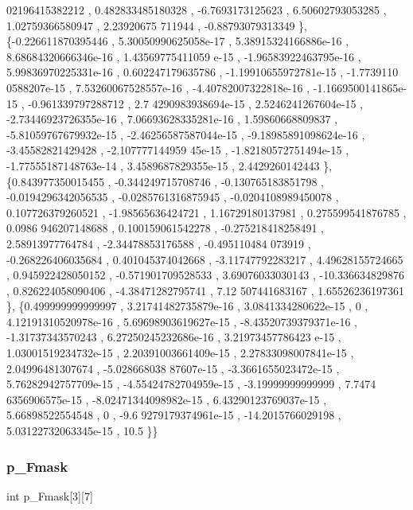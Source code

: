 \begin{DoxyCode}
      02196415382212 , 0.482833485180328 ,  -6.7693173125623 ,  6.50602793053285 ,  1.02759366580947 ,  2.23920675
      711944 , -0.88793079313349 \},
\{-0.226611870395446 , 5.30050990625058e-17 , 5.38915324166886e-16 , 8.68684320666346e-16 , 1.43569775411059
      e-15 , -1.96583922463795e-16 , 5.99836970225331e-16 , 0.602247179635786 , -1.19910655972781e-15 , -1.7739110
      0588207e-15 , 7.53260067528557e-16 , -4.40782007322818e-16 , -1.1669500141865e-15 , -0.961339797288712 , 2.7
      4290983938694e-15 , 2.5246241267604e-15 , -2.73446923726355e-16 , 7.06693628335281e-16 ,  1.59860668809837 ,
       -5.81059767679932e-15 , -2.46256587587044e-15 , -9.18985891098624e-16 , -3.45582821429428 , -2.107777144959
      45e-15 , -1.82180572751494e-15 , -1.77555187148763e-14 , 3.4589687829355e-15 ,   2.4429260142443 \},
\{0.843977350015455 , -0.344249715708746 , -0.130765183851798 , -0.0194296342056535 , -0.0285761316875945 , 
      -0.0204108989450078 , 0.107726379260521 , -1.98565636424721 ,  1.16729180137981 , 0.275599541876785 , 0.0986
      946207148688 , 0.100159061542278 , -0.275218418258491 ,  2.58913977764784 , -2.34478853176588 , -0.495110484
      073919 , -0.268226406035684 , 0.401045374042668 , -3.11747792283217 ,  4.49628155724665 , 0.945922428050152 
      , -0.571901709528533 ,  3.69076033030143 ,  -10.336634829876 , 0.826224058090406 , -4.38471282795741 ,  7.12
      507441683167 ,  1.65526236197361 \},
\{0.499999999999997 , 3.21741482735879e-16 , 3.0841334280622e-15 ,                 0 , 4.12191310520978e-16 
      , 5.69698903619627e-15 , -8.43520739379371e-16 , -1.31737343570243 , 6.27250245232686e-16 , 3.21973457786423
      e-15 , 1.03001519234732e-15 , 2.20391003661409e-15 , 2.27833098007841e-15 ,  2.04996481307674 , -5.028668038
      87607e-15 , -3.3661655023472e-15 , 5.76282942757709e-15 , -4.55424782704959e-15 , -3.19999999999999 , 7.7474
      6356906575e-15 , -8.02471344098982e-15 , 6.43290123769037e-15 ,  5.66898522554548 ,                 0 , -9.6
      9279179374961e-15 , -14.2015766029198 , 5.03122732063345e-15 ,              10.5 \}\}
\end{DoxyCode}
\mbox{\label{a00521_a6b18ffc6e470dc9d5903792503239300}} 
\subsubsection{\texorpdfstring{p\+\_\+\+Fmask}{p\_Fmask}}
{\footnotesize\ttfamily int p\+\_\+\+Fmask\mbox{[}3\mbox{]}\mbox{[}7\mbox{]}}

